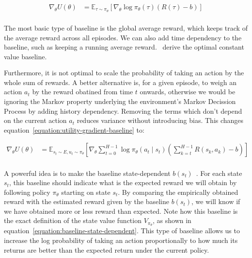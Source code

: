 \documentclass{../main.tex}{}
\begin{document}
\begin{equation}\label{equation:utility-gradient-baseline}
\begin{aligned}
\nabla_{\theta} U(\theta) & = \mathbb{E}_{\tau \sim \pi_{\theta}} [\nabla_{\theta} \log \pi_{\theta}(\tau) (R(\tau) - b)] \\
\end{aligned}
\end{equation}

The most basic type of baseline is the global average reward, which keeps track of the average reward across all episodes. We can also add time dependency to the baseline, such as keeping a running average reward.~\cite{Greensmith2004} derive the optimal constant value baseline. 

Furthermore, it is not optimal to scale the probability of taking an action by the whole sum of rewards. A better alternative is, for a given episode, to weigh an action $a_t$ by the reward obatined from time $t$ onwards, otherwise we would be ignoring the Markov property underlying the environment's Markov Decission Process by adding history dependency. Removing the terms which don't depend on the current action $a_t$ reduces variance without introducing bias. This changes equation~\ref{equation:utility-gradient-baseline} to:

\begin{equation}\label{equation:utility-gradient-baseline-temporal}
\begin{aligned}
    \nabla_{\theta} U(\theta) & = \mathbb{E}_{s_t \sim E, u_t \sim \pi_{\theta}} [\nabla_{\theta} \sum_{t=0}^{H-1}\log \pi_{\theta}(a_t \mid s_t) (\sum_{k=t}^{H-1}R(s_k, a_k) - b)] \\
\end{aligned}
\end{equation}

A powerful idea is to make the baseline state-dependent $b(s_t)$~\citep{Baxter2001}. For each state $s_t$, this baseline should indicate what is the expected reward we will obtain by following policy $\pi_{\theta}$ starting on state $s_t$. By comparing the empirically obtained reward with the estimated reward given by the baseline $b(s_t)$, we will know if we have obtained more or less reward than expected. Note how this baseline is the exact definition of the state value function $V_{\pi_{\theta}}$, as shown in equation~\ref{equation:baseline-state-dependent}. This type of baseline allows us to increase the log probability of taking an action proportionally to how much its returns are better than the expected return under the current policy.
\end{document}
